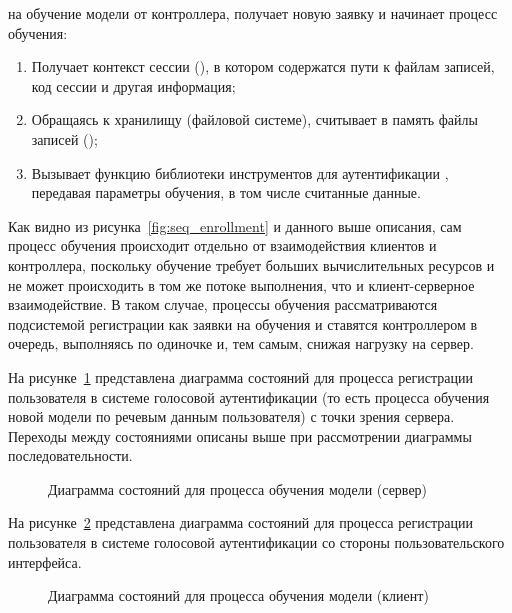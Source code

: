\begin{enumerate}
на обучение модели от контроллера, получает новую заявку и начинает процесс
обучения:
    \begin{enumerate}
        \item Получает контекст сессии (), в котором
        содержатся пути к файлам записей, код сессии и другая информация;
        \item Обращаясь к хранилищу (файловой системе), считывает в память файлы
        записей ();
        \item Вызывает функцию библиотеки инструментов для аутентификации
        , передавая параметры обучения, в том числе считанные
        данные.
    \end{enumerate}
\end{enumerate}

Как видно из рисунка~\ref{fig:seq_enrollment} и данного выше описания, сам
процесс обучения происходит отдельно от взаимодействия клиентов и контроллера,
поскольку обучение требует больших вычислительных ресурсов и не может
происходить в том же потоке выполнения, что и клиент-серверное взаимодействие.
В таком случае, процессы обучения рассматриваются подсистемой регистрации как
заявки на обучения и ставятся контроллером в очередь, выполняясь по одиночке и,
тем самым, снижая нагрузку на сервер.

На рисунке~\ref{fig:enrollment_server_sd} представлена диаграмма состояний
для процесса регистрации пользователя в системе голосовой аутентификации (то
есть процесса обучения новой модели по речевым данным пользователя) с точки
зрения сервера. Переходы между состояниями описаны выше при рассмотрении
диаграммы последовательности.

\begin{figure}
    \caption{Диаграмма состояний для процесса обучения модели (сервер)}
    \label{fig:enrollment_server_sd}
\end{figure}

На рисунке~\ref{fig:enrollment_client_sd} представлена диаграмма состояний для
процесса регистрации пользователя в системе голосовой аутентификации со стороны
пользовательского интерфейса.
\begin{figure}[htp!]
    \caption{Диаграмма состояний для процесса обучения модели (клиент)}
    \label{fig:enrollment_client_sd}
\end{figure}


